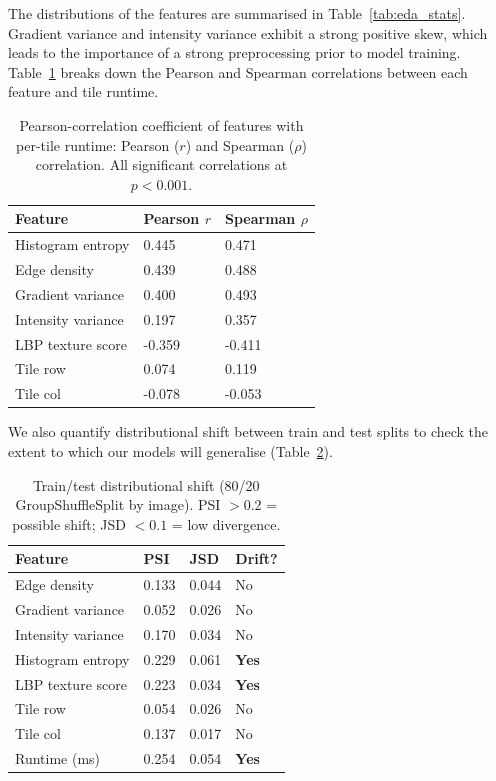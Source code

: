 \documentclass[acmsmall]{acmart}
\begin{document}
The distributions of the features are summarised in Table~\ref{tab:eda_stats}. Gradient variance and intensity variance exhibit a strong positive skew, which leads to the importance of a strong preprocessing prior to model training. Table~\ref{tab:eda_corr} breaks down the Pearson and Spearman correlations between each feature and tile runtime.

\begin{table}[htbp]
  \caption{Pearson-correlation coefficient of features with per-tile runtime: Pearson ($r$) and Spearman ($\rho$) correlation. All significant correlations at $p < 0.001$.}
  \label{tab:eda_corr}
  \small
  \begin{tabularx}{\linewidth}{lXX}
    \toprule
    \textbf{Feature}       & \textbf{Pearson $r$} & \textbf{Spearman $\rho$} \\
    \midrule
    Histogram entropy      &  0.445 &  0.471 \\
    Edge density           &  0.439 &  0.488 \\
    Gradient variance      &  0.400 &  0.493 \\
    Intensity variance     &  0.197 &  0.357 \\
    LBP texture score      & -0.359 & -0.411 \\
    Tile row               &  0.074 &  0.119 \\
    Tile col               & -0.078 & -0.053 \\
    \bottomrule
  \end{tabularx}
\end{table}

We also quantify distributional shift between train and test splits to check the extent to which our models will generalise (Table~\ref{tab:psi_jsd}).

\begin{table}[htbp]
  \caption{Train/test distributional shift (80/20 GroupShuffleSplit by image). PSI $> 0.2$ = possible shift; JSD $< 0.1$ = low divergence.}
  \label{tab:psi_jsd}
  \small
  \begin{tabularx}{\linewidth}{lXXX}
    \toprule
    Feature    & PSI & JSD & Drift? \\
    \midrule
    Edge density        & 0.133 & 0.044 & No \\
    Gradient variance   & 0.052 & 0.026 & No \\
    Intensity variance  & 0.170 & 0.034 & No \\
    Histogram entropy   & 0.229 & 0.061 & \textbf{Yes} \\
    LBP texture score   & 0.223 & 0.034 & \textbf{Yes} \\
    Tile row            & 0.054 & 0.026 & No \\
    Tile col            & 0.137 & 0.017 & No \\
    Runtime (ms)        & 0.254 & 0.054 & \textbf{Yes} \\
    \bottomrule
  \end{tabularx}
\end{table}
\end{document}
